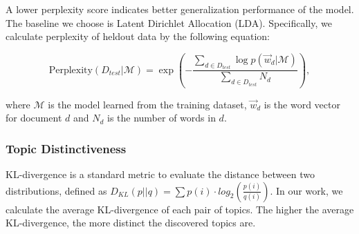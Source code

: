 A lower perplexity score indicates better generalization performance of the model. The baseline we choose is Latent Dirichlet Allocation (LDA). Specifically, we calculate perplexity of heldout data by the following equation:

\vspace{-1mm}

\begin{equation}
	\textrm{Perplexity}({D}_{test}|\mathcal{M})=\exp(-\frac{{\sum}_{d\in D_{test}} \log p(\overrightarrow{w}_{d}|\mathcal{M})}{{\sum}_{d\in D_{test}} N_d}),
\end{equation}



\noindent where $\mathcal{M}$ is the model learned from the training dataset, $\overrightarrow{w}_{d}$ is the word vector for document $d$ and $N_d$ is the number of words in $d$.


\subsubsection{Topic Distinctiveness}


KL-divergence is a standard metric to evaluate the distance between two distributions, defined as $D_{KL}(p||q) = \sum{p(i) \cdot log_2(\frac{p(i)}{q(i)})}$. In our work, we calculate the average KL-divergence of each pair of topics. The higher the average KL-divergence, the more distinct the discovered topics are.
